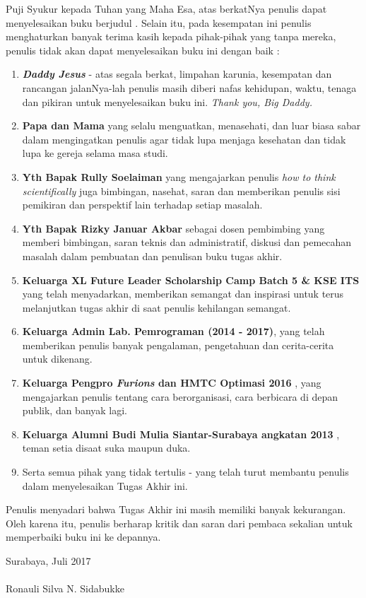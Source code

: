 	  Puji Syukur kepada Tuhan yang Maha Esa, atas berkatNya penulis dapat menyelesaikan buku berjudul \textbf{\judul}. 
	  \newline
	  \indent Selain itu, pada kesempatan ini penulis menghaturkan banyak terima kasih kepada pihak-pihak yang tanpa mereka, penulis tidak akan dapat menyelesaikan buku ini dengan baik :
  \begin{enumerate}
  	\item \textbf{\textit{Daddy Jesus}} - atas segala berkat, limpahan karunia, kesempatan dan rancangan jalanNya-lah penulis masih diberi nafas kehidupan, waktu, tenaga dan pikiran untuk menyelesaikan buku ini. \textit{Thank you, Big Daddy.}
    \item \textbf{Papa dan Mama} yang selalu menguatkan, menasehati, dan luar biasa sabar dalam mengingatkan penulis agar tidak lupa menjaga kesehatan dan tidak lupa ke gereja selama masa studi.
    \item \textbf{Yth Bapak Rully Soelaiman} yang mengajarkan penulis \textit{how to think scientifically} juga bimbingan, nasehat, saran dan memberikan penulis sisi pemikiran dan perspektif lain terhadap setiap masalah.
    \item \textbf{Yth Bapak Rizky Januar Akbar} sebagai dosen pembimbing yang memberi bimbingan, saran teknis dan administratif, diskusi dan pemecahan masalah dalam pembuatan dan penulisan buku tugas akhir.
    \item \textbf{Keluarga XL Future Leader Scholarship Camp Batch 5 \& KSE ITS} yang telah menyadarkan, memberikan semangat dan inspirasi untuk terus melanjutkan tugas akhir di saat penulis kehilangan semangat.
    \item \textbf{Keluarga Admin Lab. Pemrograman (2014 - 2017)}, yang telah memberikan penulis banyak pengalaman, pengetahuan dan cerita-cerita untuk dikenang.
    \item  \textbf{Keluarga Pengpro \textit{Furions} dan HMTC Optimasi 2016 }, yang mengajarkan penulis tentang cara berorganisasi, cara berbicara di depan publik, dan banyak lagi. 
    \item \textbf{Keluarga Alumni Budi Mulia Siantar-Surabaya angkatan 2013 }, teman setia disaat suka maupun duka. 
    \item Serta semua pihak yang tidak tertulis - yang telah turut membantu penulis dalam menyelesaikan Tugas Akhir ini.
  \end{enumerate}
  
  \indent Penulis menyadari bahwa Tugas Akhir ini masih memiliki banyak kekurangan. Oleh karena itu, penulis berharap kritik dan saran dari pembaca sekalian untuk memperbaiki buku ini ke depannya.

  \hfill Surabaya, Juli 2017 \\ \\ 


  \hfill Ronauli Silva N. Sidabukke

\cleardoublepage %

